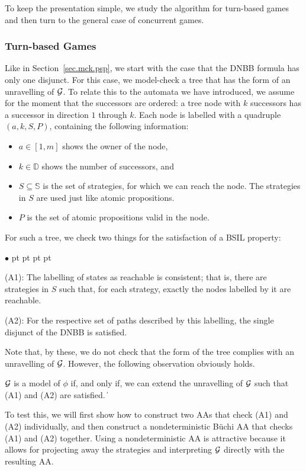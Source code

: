 \documentclass[11pt]{article}
\newcommand{\calg}{{\cal G}}
\newcommand{\bbbbd}{{\mathbb D}}
\newcommand{\bbbbs}{{\mathbb S}}
\def\qed{\ifmmode\|\else{\unskip\nobreak\hfil
\penalty50\hskip1em\null\nobreak\hfil$\blacksquare$
\parfillskip=0pt\finalhyphendemerits=0\endgraf}\fi}
\newenvironment{list1}{\begin{list}{$\bullet$}
{\topsep 0 pt \parsep 0 pt \partopsep 0 pt \itemsep 0 pt}}{\end{list}}
\begin{document}
To keep the presentation simple, we study the algorithm for turn-based games and then turn to the general case of concurrent games.

\subsubsection{Turn-based Games}
Like in Section~\ref{sec.mck.psp}, 
we start with the case that the DNBB formula has only one disjunct.
For this case, we model-check a tree that has the form 
of an unravelling of $\calg$.
To relate this to the automata we have introduced, 
we assume for the moment that the successors are ordered: 
a tree node with $k$ successors has a successor in direction $1$ through $k$.
Each node is labelled with a quadruple\label{reply2.triple.2.quadruple} $(a,k,S,P)$, 
containing the following information:
\begin{itemize}
\item $a \in [1,m]$ shows the owner of the node,
\item $k \in \bbbbd$ shows the number of successors, and
\item $S\subseteq \bbbbs$ is the set of strategies, 
  for which we can reach the node.
  The strategies in $S$ are used just like atomic propositions.
\item $P$ is the set of atomic propositions valid in the node.
\end{itemize}
For such a tree, we check two things for the satisfaction of 
a BSIL property:
\begin{list1}
\item[(A1):] The labelling of states as reachable is consistent; 
  that is, there are strategies in $S$ such that, 
  for each strategy, exactly the nodes labelled by it are reachable.
\item[(A2):] For the respective set of paths described by this labelling, 
  the single disjunct of the DNBB is satisfied.
\end{list1}  
Note that, by these, we do not check that the form of 
the tree complies with an unravelling of $\calg$.
%
However, the following observation obviously holds.

{\lemma \label{lemma.A1.A2} 
$\calg$ is a model of $\phi$ if, and only if, 
we can extend the unravelling of $\calg$ such that (A1) and (A2) 
are satisfied.
} 
\qed 

To test this, we will first show how to construct two AAs that 
check (A1) and (A2) individually, and 
then construct a nondeterministic B\"uchi AA that checks (A1) and (A2) 
together.
Using a nondeterministic AA is attractive because it allows 
for projecting away the strategies and interpreting $\calg$ directly 
with the resulting AA.
\end{document}
